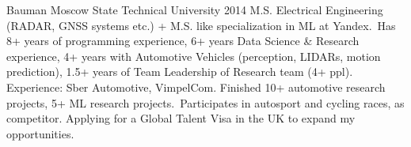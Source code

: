 Bauman Moscow State Technical University 2014  M.S. Electrical Engineering (RADAR, GNSS systems etc.) + M.S. like specialization in ML at Yandex.\
Has 8+ years of programming experience, 6+ years Data Science \& Research experience, 4+ years with Automotive Vehicles (perception, LIDARs, motion prediction), 1.5+ years of Team Leadership of Research team (4+ ppl). Experience: Sber Automotive, VimpelCom. Finished 10+ automotive research projects, 5+ ML research projects.\
Participates in autosport and cycling races, as competitor. Applying for a Global Talent Visa in the UK to expand my opportunities.